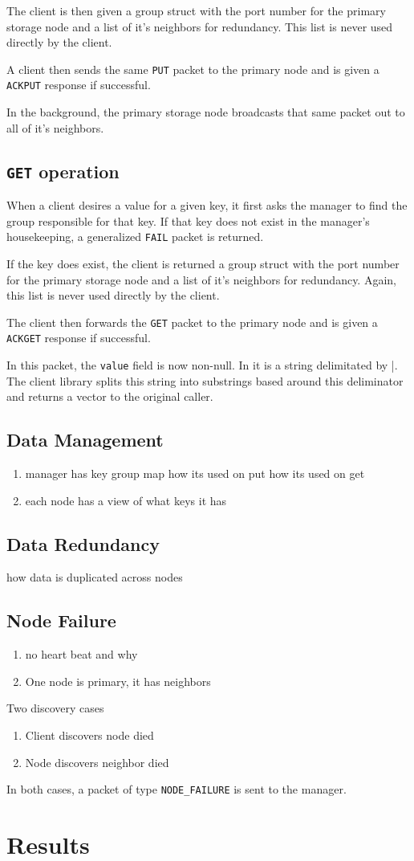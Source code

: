 \documentclass{article}
\begin{document}
The client is then given a group struct with the port number for the primary storage node and a list of it's neighbors for redundancy. 
This list is never used directly by the client.

A client then sends the same \texttt{PUT} packet to the primary node and is given a \texttt{ACKPUT} response if successful.

In the background, the primary storage node broadcasts that same packet out to all of it's neighbors.

\subsection{\texttt{GET} operation}
When a client desires a value for a given key, it first asks the manager to find the group responsible for that key.
If that key does not exist in the manager's housekeeping, a generalized \texttt{FAIL} packet is returned.

If the key does exist, the client is returned a group struct with the port number for the primary storage node and a list of it's neighbors for redundancy. 
Again, this list is never used directly by the client.

The client then forwards the \texttt{GET} packet to the primary node and is given a \texttt{ACKGET} response if successful.

In this packet, the \texttt{value} field is now non-null. 
In it is a string delimitated by |. 
The client library splits this string into substrings based around this deliminator and returns a vector to the original caller.



\subsection{Data Management}
\begin{enumerate}
    \item manager has key group map
        \subitem how its used on put
        \subitem how its used on get
    \item each node has a view of what keys it has
\end{enumerate}
\subsection{Data Redundancy}
how data is duplicated across nodes
\subsection{Node Failure}
\begin{enumerate}
    \item no heart beat and why
    \item One node is primary, it has neighbors
\end{enumerate}

Two discovery cases
\begin{enumerate}
    \item Client discovers node died
    \item Node discovers neighbor died
\end{enumerate}

In both cases, a packet of type \texttt{NODE\_FAILURE} is sent to the manager.
\section{Results}
\end{document}
